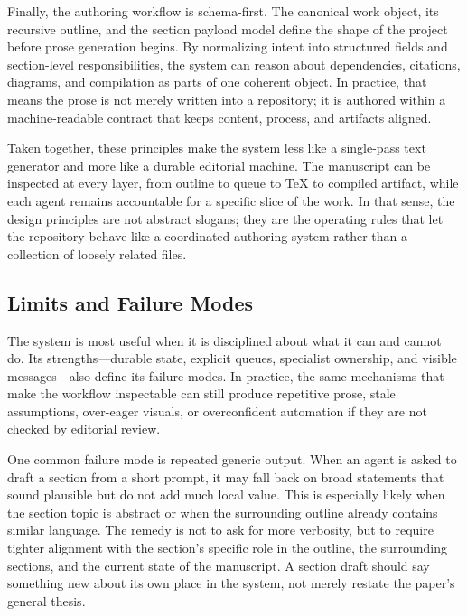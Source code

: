\documentclass[11pt]{article}
\begin{document}
Finally, the authoring workflow is schema-first. The canonical work object, its recursive outline, and the section payload model define the shape of the project before prose generation begins. By normalizing intent into structured fields and section-level responsibilities, the system can reason about dependencies, citations, diagrams, and compilation as parts of one coherent object. In practice, that means the prose is not merely written into a repository; it is authored within a machine-readable contract that keeps content, process, and artifacts aligned.

Taken together, these principles make the system less like a single-pass text generator and more like a durable editorial machine. The manuscript can be inspected at every layer, from outline to queue to \TeX{} to compiled artifact, while each agent remains accountable for a specific slice of the work. In that sense, the design principles are not abstract slogans; they are the operating rules that let the repository behave like a coordinated authoring system rather than a collection of loosely related files.



\subsection{Limits and Failure Modes}


The system is most useful when it is disciplined about what it can and cannot do. Its strengths---durable state, explicit queues, specialist ownership, and visible messages---also define its failure modes. In practice, the same mechanisms that make the workflow inspectable can still produce repetitive prose, stale assumptions, over-eager visuals, or overconfident automation if they are not checked by editorial review.

One common failure mode is repeated generic output. When an agent is asked to draft a section from a short prompt, it may fall back on broad statements that sound plausible but do not add much local value. This is especially likely when the section topic is abstract or when the surrounding outline already contains similar language. The remedy is not to ask for more verbosity, but to require tighter alignment with the section's specific role in the outline, the surrounding sections, and the current state of the manuscript. A section draft should say something new about its own place in the system, not merely restate the paper's general thesis.
\end{document}
